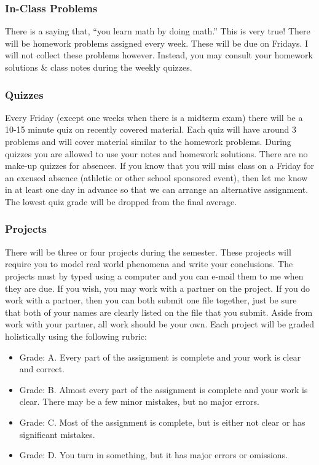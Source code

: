 \documentclass[10pt]{article}
\begin{document}
\subsubsection*{In-Class Problems}

There is a saying that, “you learn math by doing math.” This is very true! There will be homework problems assigned every week. These will be due on Fridays. I will not collect these problems however. Instead, you may consult your homework solutions & class notes during the weekly quizzes.


\subsubsection*{Quizzes}

Every Friday (except one weeks when there is a midterm exam) there will be a 10-15 minute quiz on recently covered material. Each quiz will have around 3 problems and will cover material similar to the homework problems. During quizzes you are allowed to use your notes and homework solutions. There are no make-up quizzes for absences. If you know that you will miss class on a Friday for an excused absence (athletic or other school sponsored event), then let me know in at least one day in advance so that we can arrange an alternative assignment. The lowest quiz grade will be dropped from the final average.

\subsubsection*{Projects}

There will be three or four projects during the semester. These projects will require you to model real world phenomena and write your conclusions. The projects must by typed using a computer and you can e-mail them to me when they are due. If you wish, you may work with a partner on the project. If you do work with a partner, then you can both submit one file together, just be sure that both of your names are clearly listed on the file that you submit. Aside from work with your partner, all work should be your own. Each project will be graded holistically using the following rubric:

\begin{itemize}
\item Grade: A. Every part of the assignment is complete and your work is clear and correct.
\item Grade: B. Almost every part of the assignment is complete and your work is clear. There may be a few minor mistakes, but no major errors.
\item Grade: C. Most of the assignment is complete, but is either not clear or has significant mistakes.
\item Grade: D. You turn in something, but it has major errors or omissions.
\end{itemize}
\end{document}
